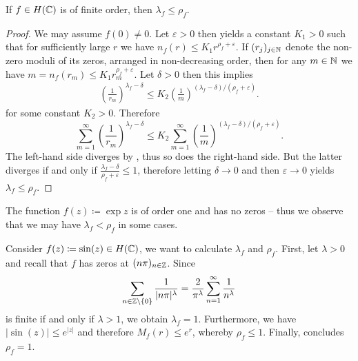 \begin{theorem} \label{thm:inequality-order-exponent-of-convergence}
    If $f \in H(\mathbb{C})$ is of finite order, then $\lambda_f \leq \rho_f$.
\end{theorem}

\begin{proof}
    We may assume $f(0) \neq 0$. Let $\varepsilon > 0$ then  yields a constant $K_1 > 0$ such that for sufficiently large $r$ we have $n_f(r) \leq K_1 r^{\rho_f + \varepsilon}$. If $(r_j)_{j \in \mathbb{N}}$ denote the non-zero moduli of its zeros, arranged in non-decreasing order, then for any $m \in \mathbb{N}$ we have $m = n_f(r_m) \leq K_1 r_m^{\rho_f + \varepsilon}$. Let $\delta > 0$ then this implies
    \begin{align*}
        \left( \frac{1}{r_m} \right)^{\lambda_f - \delta} \leq K_2 \left( \frac{1}{m} \right)^{(\lambda_f - \delta)/(\rho_f + \varepsilon)}.
    \end{align*}
    for some constant $K_2 > 0$. Therefore
    \begin{equation*}
        \sum_{m=1}^\infty \left( \frac{1}{r_m} \right)^{\lambda_f - \delta} \leq K_2 \sum_{m=1}^\infty \left( \frac{1}{m} \right)^{(\lambda_f - \delta)/(\rho_f + \varepsilon)}.
    \end{equation*}
    The left-hand side diverges by , thus so does the right-hand side. But the latter diverges if and only if $\frac{\lambda_f - \delta}{\rho_f + \varepsilon} \leq 1$, therefore letting $\delta \to 0$ and then $\varepsilon \to 0$ yields $\lambda_f \leq \rho_f$.
\end{proof}

\begin{remark}
    The function $f(z) \coloneqq \exp z$ is of order one and has no zeros -- thus we observe that we may have $\lambda_f < \rho_f$ in some cases.
\end{remark}

\begin{example} \label{exm:exponent-of-convergence}
    Consider $f(z) \coloneqq \sin(z) \in H(\mathbb{C})$, we want to calculate $\lambda_f$ and $\rho_f$. First, let $\lambda > 0$ and recall that $f$ has zeros at $(n \pi)_{n \in \mathbb{Z}}$. Since
    $$ \sum_{n \in \mathbb{Z} \setminus \{0\}} \frac{1}{\vert n \pi \vert^\lambda} = \frac{2}{\pi^\lambda} \sum_{n=1}^\infty \frac{1}{n^\lambda} $$
    is finite if and only if $\lambda > 1$, we obtain $\lambda_f = 1$. Furthermore, we have $\vert \sin(z) \vert \leq e^{\vert z \vert}$
    and therefore $M_f(r) \leq e^r$, whereby $\rho_f \leq 1$. Finally,  concludes $\rho_f = 1$.
\end{example}

